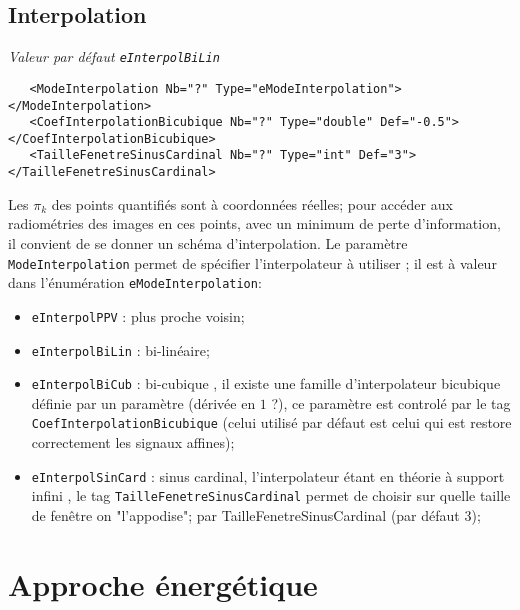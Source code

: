 \subsection{Interpolation}

\emph{Valeur par d\'efaut {\tt eInterpolBiLin}}

\begin{verbatim}
   <ModeInterpolation Nb="?" Type="eModeInterpolation"> </ModeInterpolation>
   <CoefInterpolationBicubique Nb="?" Type="double" Def="-0.5"> </CoefInterpolationBicubique>
   <TailleFenetreSinusCardinal Nb="?" Type="int" Def="3"> </TailleFenetreSinusCardinal>
\end{verbatim}

Les $\pi_k$ des  points quantifi\'es sont \`a coordonn\'ees r\'eelles;
pour acc\'eder aux radiom\'etries des images en ces points, avec
un minimum de perte d'information, il convient de se donner un 
sch\'ema d'interpolation. Le param\`etre {\tt ModeInterpolation}
permet de sp\'ecifier l'interpolateur \`a utiliser ; il est 
\`a valeur dans l'\'enum\'eration {\tt eModeInterpolation}:

\begin{itemize}
    \item{\tt eInterpolPPV}  : plus proche voisin;
    \item{\tt eInterpolBiLin}  : bi-lin\'eaire;
    \item{\tt eInterpolBiCub}  : bi-cubique , il existe une famille
         d'interpolateur bicubique d\'efinie par un param\`etre
	 (d\'eriv\'ee en $1$ ?), ce param\`etre est control\'e par
	 le tag {\tt CoefInterpolationBicubique} (celui utilis\'e par d\'efaut 
	 est celui qui est restore correctement les signaux  affines);
    \item{\tt eInterpolSinCard}  : sinus cardinal,  l'interpolateur
         \'etant en th\'eorie \`a support infini , le tag
	 {\tt TailleFenetreSinusCardinal} permet de choisir sur
	 quelle taille de fen\^etre on "l'appodise"; 
         par TailleFenetreSinusCardinal (par d\'efaut 3);
\end{itemize}


\section{Approche \'energ\'etique}

